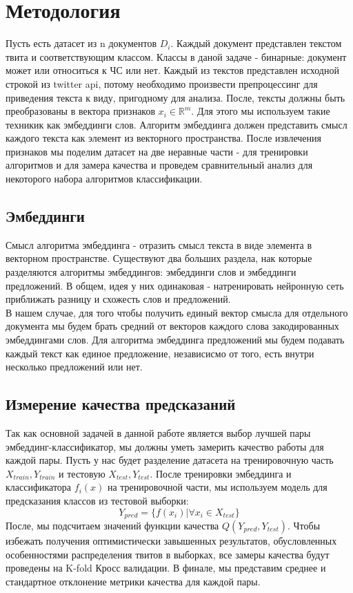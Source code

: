 
\section{Методология}
Пусть есть датасет из n документов $D_i$. Каждый документ представлен текстом твита и соответствующим классом. Классы в даной задаче - бинарные: документ может или относиться к ЧС или нет. Каждый из текстов представлен исходной строкой из twitter api, потому необходимо произвести препроцессинг для приведения текста к виду, пригодному для анализа. После, тексты должны быть преобразованы в вектора признаков $x_i \in \mathbb{R}^m$. Для этого мы используем такие техникик как эмбеддинги слов.  Алгоритм эмбеддинга должен представить смысл каждого текста как элемент из векторного пространства. После извлечения признаков мы поделим датасет на две неравные части - для тренировки алгоритмов и для замера качества и проведем сравнительный анализ для некоторого набора алгоритмов классификации.

\subsection{Эмбеддинги}
Смысл алгоритма эмбеддинга - отразить смысл текста в виде элемента в векторном пространстве. Существуют два больших раздела, нак которые разделяются алгоритмы эмбеддингов: эмбеддинги слов и эмбеддинги предложений. В общем, идея у них одинаковая - натренировать нейронную сеть приближать разницу и схожесть слов и предложений.\\
В нашем случае, для того чтобы получить единый вектор смысла для отдельного документа мы будем брать средний от векторов каждого слова закодированных эмбеддингами слов. Для алгоритма эмбеддинга предложений мы будем подавать каждый текст как единое предложение, независисмо от того, есть внутри несколько предложений или нет.

\subsection{Измерение качества предсказаний}
Так как основной задачей в данной работе является выбор лучшей пары эмбеддинг-классификатор, мы должны уметь замерить качество работы для каждой пары. Пусть у нас будет разделение датасета на тренировочную часть  $X_{train}, Y_{train}$ и тестовую $X_{test}, Y_{test}$. После тренировки эмбеддинга и классификатора $f_i(x)$ на тренировочной части, мы используем модель для предсказания классов из тестовой выборки: $$ Y_{pred} = \{f(x_i)|\forall x_i \in X_{test}\} $$
После, мы подсчитаем значений функции качества $Q(Y_{pred}, Y_{test})$. Чтобы избежать получения оптимистически завышенных результатов, обусловленных особенностями распределения твитов в выборках, все замеры качества будут проведены на K-fold Кросс валидации. В финале, мы представим среднее и стандартное отклонение метрики качества для каждой пары.

